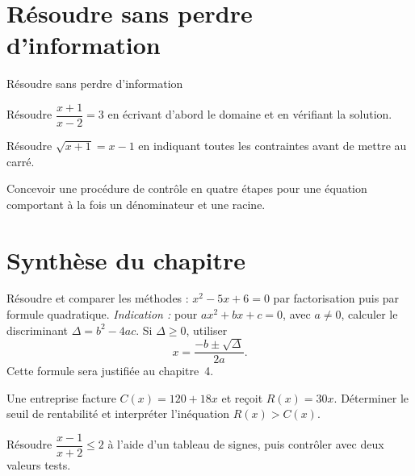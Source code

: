 \section{Résoudre sans perdre d'information}
\label{workbook:section:02.08}
\begin{exerciseblock}{Résoudre sans perdre d'information}
\item Résoudre $\dfrac{x+1}{x-2}=3$ en écrivant d'abord le domaine et en vérifiant la solution.
\item Résoudre $\sqrt{x+1}=x-1$ en indiquant toutes les contraintes avant de mettre au carré.
\item Concevoir une procédure de contrôle en quatre étapes pour une équation comportant à la fois un dénominateur et une racine.
\end{exerciseblock}
\section*{Synthèse du chapitre}
\begin{synthesisbox}
\item Résoudre et comparer les méthodes : $x^2-5x+6=0$ par factorisation puis par formule quadratique. \emph{Indication :} pour $ax^2+bx+c=0$, avec $a\ne0$, calculer le discriminant $\Delta=b^2-4ac$. Si $\Delta\ge0$, utiliser
\[
x=\frac{-b\pm\sqrt{\Delta}}{2a}.
\]
Cette formule sera justifiée au chapitre~4.
\item Une entreprise facture $C(x)=120+18x$ et reçoit $R(x)=30x$. Déterminer le seuil de rentabilité et interpréter l'inéquation $R(x)>C(x)$.
\item Résoudre $\dfrac{x-1}{x+2}\le2$ à l'aide d'un tableau de signes, puis contrôler avec deux valeurs tests.
\end{synthesisbox}
